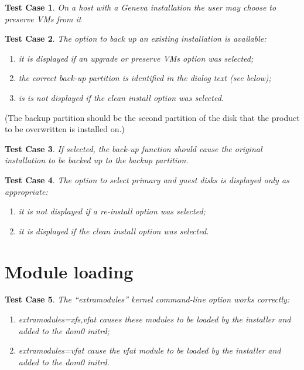 \documentclass[a4paper]{article}
\newtheorem{testcase}{Test Case}
\begin{document}
\begin{testcase}
On a host with a Geneva installation the user may choose to preserve
VMs from it
\end{testcase}

\begin{testcase}
The option to back up an existing installation is available:
\begin{enumerate}
\item it is displayed if an upgrade or preserve VMs option was
selected;
\item the correct back-up partition is identified in the dialog text
  (see below);
\item is is not displayed if the clean install option was selected.
\end{enumerate}
\end{testcase}
(The backup partition should be the second partition of the disk that
the product to be overwritten is installed on.)

\begin{testcase}
If selected, the back-up function should cause the original
installation to be backed up to the backup partition.
\end{testcase}

\begin{testcase}
The option to select primary and guest disks is displayed only as
appropriate:
\begin{enumerate}
\item it is not displayed if a re-install option was selected;
\item it is displayed if the clean install option was selected.
\end{enumerate}
\end{testcase}


\section{Module loading}

\begin{testcase}
The ``extramodules'' kernel command-line option works correctly:
\begin{enumerate}
\item extramodules=xfs,vfat causes these modules to be loaded by the
  installer and added to the dom0 initrd;
\item extramodules=vfat cause the vfat module to be loaded by the
  installer and added to the dom0 initrd.
\end{enumerate}
\end{testcase}
\end{document}
